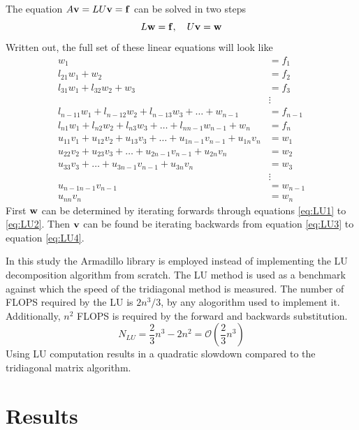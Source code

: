 \documentclass[10pt, a4paper]{amsart}
\begin{document}
The equation $A\vb{v}=LU\vb{v}=\vb{f}$ can be solved in two steps
\begin{equation}
L\vb{w}=\vb{f}, \quad U\vb{v}=\vb{w}
\end{equation}
Written out, the full set of these linear equations will look like
\begin{align}
w_1 &= f_1 \label{eq:LU1}\\
l_{21}w_1 + w_2 &= f_2 \\
l_{31}w_1 + l_{32}w_2 +w_3 &= f_3 \\
 & \vdots \\
l_{n-11}w_1 + l_{n-12}w_2 + l_{n-13}w_3 + \dots + w_{n-1}  &=
                                                                    f_{n-1}\\
l_{n1}w_1 + l_{n2}w_2 + l_{n3}w_3 + \dots + l_{nn-1}w_{n-1} + w_n &=
                                                                    f_n
  \label{eq:LU2}\\  
u_{11}v_1 + u_{12}v_2 + u_{13}v_3 + \dots + u_{1n-1}v_{n-1} +
  u_{1n}v_n &= w_1  \label{eq:LU4}\\  
u_{22}v_2 + u_{23}v_3 + \dots + u_{2n-1}v_{n-1} + u_{2n}v_n &= w_2 \\
u_{33}v_3 + \dots+u_{3n-1}v_{n-1} + u_{3n}v_n &= w_3 \\
 & \vdots \\
u_{n-1n-1}v_{n-1} &=  w_{n-1} \\
u_{nn}v_n &= w_n \label{eq:LU3}
\end{align}
First $\vb{w}$ can be determined by iterating forwards through
equations \ref{eq:LU1} to \ref{eq:LU2}. Then $\vb{v}$ can be found be
iterating backwards from equation \ref{eq:LU3} to equation
\ref{eq:LU4}. 

In this study the Armadillo library
is employed instead of implementing the LU decomposition
algorithm from scratch. The LU method is used as a benchmark against which the
speed of the tridiagonal method is measured. The number of FLOPS
required by the LU is $2n^3/3$, by any alogorithm used to implement
it\cite{golub}. Additionally, $n^2$ FLOPS is required by the forward
and backwards substitution.
\begin{equation}
N_{LU}=\frac{2}{3}n^3-2n^2=\mathcal{O}(\frac{2}{3}n^3)
\end{equation}
Using LU computation results in a quadratic slowdown compared to the
tridiagonal matrix algorithm.

\section{Results}
\end{document}
